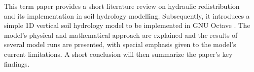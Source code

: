 This term paper provides a short literature review on hydraulic redistribution and its implementation in soil hydrology modelling.
Subsequently, it introduces a simple 1D vertical soil hydrology model to be implemented in GNU Octave \parencite{Eaton2015}.
The model’s physical and mathematical approach are explained and the results of several model runs are presented, with special emphasis given to the model’s current limitations.
A short conclusion will then summarize the paper’s key findings.

